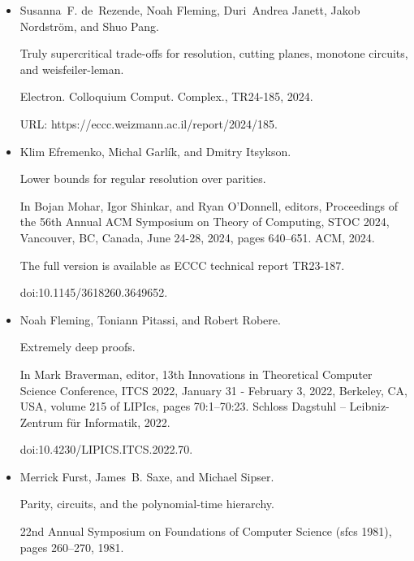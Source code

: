 \begin{itemize}
doi:10.2307/2273702.





\item 
[13]

Susanna F. de Rezende, Noah Fleming, Duri Andrea Janett, Jakob Nordström,
and Shuo Pang.


Truly supercritical trade-offs for resolution, cutting planes,
monotone circuits, and weisfeiler-leman.


Electron. Colloquium Comput. Complex., TR24-185, 2024.


URL: https://eccc.weizmann.ac.il/report/2024/185.





\item 
[14]

Klim Efremenko, Michal Garlík, and Dmitry Itsykson.


Lower bounds for regular resolution over parities.


In Bojan Mohar, Igor Shinkar, and Ryan O’Donnell, editors, Proceedings of the 56th Annual ACM Symposium on Theory of Computing, STOC
2024, Vancouver, BC, Canada, June 24-28, 2024, pages 640–651. ACM, 2024.


The full version is available as ECCC technical report TR23-187.


doi:10.1145/3618260.3649652.





\item 
[15]

Noah Fleming, Toniann Pitassi, and Robert Robere.


Extremely deep proofs.


In Mark Braverman, editor, 13th Innovations in Theoretical
Computer Science Conference, ITCS 2022, January 31 - February 3, 2022,
Berkeley, CA, USA, volume 215 of LIPIcs, pages 70:1–70:23. Schloss
Dagstuhl – Leibniz-Zentrum für Informatik, 2022.


doi:10.4230/LIPICS.ITCS.2022.70.





\item 
[16]

Merrick Furst, James B. Saxe, and Michael Sipser.


Parity, circuits, and the polynomial-time hierarchy.


22nd Annual Symposium on Foundations of Computer Science (sfcs
1981), pages 260–270, 1981.



\end{itemize}
